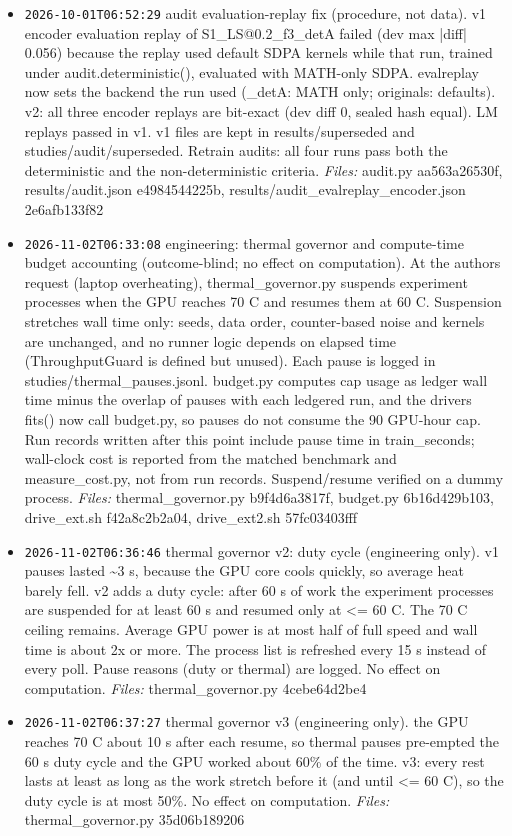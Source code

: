 \documentclass[11pt]{article}
\begin{document}
\begin{itemize}
\item \texttt{2026-10-01T06:52:29} audit evaluation-replay fix (procedure, not data). v1 encoder evaluation replay of S1\_LS@0.2\_f3\_detA failed (dev max |diff| 0.056) because the replay used default SDPA kernels while that run, trained under audit.deterministic(), evaluated with MATH-only SDPA. evalreplay now sets the backend the run used (\_detA: MATH only; originals: defaults). v2: all three encoder replays are bit-exact (dev diff 0, sealed hash equal). LM replays passed in v1. v1 files are kept in results/superseded and studies/audit/superseded. Retrain audits: all four runs pass both the deterministic and the non-deterministic criteria. \emph{Files:} audit.py aa563a26530f, results/audit.json e4984544225b, results/audit\_evalreplay\_encoder.json 2e6afb133f82
\item \texttt{2026-11-02T06:33:08} engineering: thermal governor and compute-time budget accounting (outcome-blind; no effect on computation). At the authors request (laptop overheating), thermal\_governor.py suspends experiment processes when the GPU reaches 70 C and resumes them at 60 C. Suspension stretches wall time only: seeds, data order, counter-based noise and kernels are unchanged, and no runner logic depends on elapsed time (ThroughputGuard is defined but unused). Each pause is logged in studies/thermal\_pauses.jsonl. budget.py computes cap usage as ledger wall time minus the overlap of pauses with each ledgered run, and the drivers fits() now call budget.py, so pauses do not consume the 90 GPU-hour cap. Run records written after this point include pause time in train\_seconds; wall-clock cost is reported from the matched benchmark and measure\_cost.py, not from run records. Suspend/resume verified on a dummy process. \emph{Files:} thermal\_governor.py b9f4d6a3817f, budget.py 6b16d429b103, drive\_ext.sh f42a8c2b2a04, drive\_ext2.sh 57fc03403fff
\item \texttt{2026-11-02T06:36:46} thermal governor v2: duty cycle (engineering only). v1 pauses lasted \textasciitilde{}3 s, because the GPU core cools quickly, so average heat barely fell. v2 adds a duty cycle: after 60 s of work the experiment processes are suspended for at least 60 s and resumed only at <= 60 C. The 70 C ceiling remains. Average GPU power is at most half of full speed and wall time is about 2x or more. The process list is refreshed every 15 s instead of every poll. Pause reasons (duty or thermal) are logged. No effect on computation. \emph{Files:} thermal\_governor.py 4cebe64d2be4
\item \texttt{2026-11-02T06:37:27} thermal governor v3 (engineering only). the GPU reaches 70 C about 10 s after each resume, so thermal pauses pre-empted the 60 s duty cycle and the GPU worked about 60\% of the time. v3: every rest lasts at least as long as the work stretch before it (and until <= 60 C), so the duty cycle is at most 50\%. No effect on computation. \emph{Files:} thermal\_governor.py 35d06b189206

\end{itemize}
\end{document}
